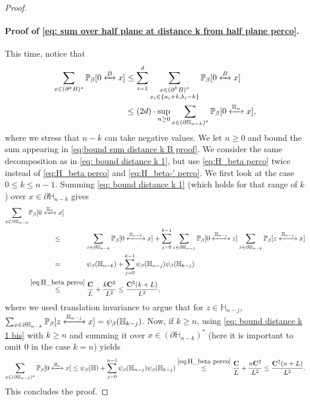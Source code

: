 \documentclass[11pt,a4paper]{article}
\numberwithin{equation}{section}
\theoremstyle{plain}
\theoremstyle{definition}
\newcommand\bfC{\mathbf{C}}
\newcommand{\connect}{\xleftrightarrow}
\begin{document}
\begin{proof}
 \paragraph{Proof of  \eqref{eq: sum over half plane at distance k from half plane perco}.} This time, notice that
 \begin{align}\notag
 	\sum_{x\in (\partial^k B)^*}\mathbb P_\beta[0\connect{B\:}x]&\leq \sum_{i=1}^{d}\sum_{\substack{x\in (\partial^k B)^*\\x_i\in\{a_i+k,b_i-k\}}}\mathbb P_{\beta}[0\connect{B\:}x]\\&\leq (2d)\cdot \sup_{n\geq 0}\sum_{x\in (\partial \mathbb H_{n-k})^*}\mathbb P_\beta[0\connect{\mathbb H_n\:}x],\label{eq:bound sum distance k B proof}
 \end{align}
where we stress that $n-k$ can take negative values.
 We let $n\geq 0$ and bound the sum appearing in \eqref{eq:bound sum distance k B proof}. We consider the same decomposition as in \eqref{eq: bound distance k 1}, but use \eqref{eq:H_beta perco} twice instead of \eqref{eq:H_beta perco} and \eqref{eq:H_beta-' perco}. We first look at the case $0\leq k \leq n-1$. Summing \eqref{eq: bound distance k 1} (which holds for that range of $k$) over $x\in \partial \mathbb H_{n-k}$ gives 
  \begin{align}\notag
  	 \sum_{x\in \partial\mathbb H_{n-k}}&\mathbb P_\beta [0\connect{\mathbb H_n\:}x]\\&\stackrel{\phantom{\eqref{eq:H_beta perco}}}\leq \sum_{x\in \partial\mathbb H_{n-k}}\mathbb P_\beta[0\connect{\mathbb H_{n-k}\:}x]+\sum_{j=0}^{k-1}\sum_{z\in \partial \mathbb H_{n-j}}\mathbb P_\beta[0\connect{\mathbb H_{n-j}\:}z]\sum_{x\in \partial\mathbb H_{n-k}}\mathbb P_\beta[z\connect{\mathbb H_{n-j}\:}x]\notag
  	 \\&\stackrel{\phantom{\eqref{eq:H_beta perco}}}=\psi_\beta(\mathbb H_{n-k})+\sum_{j=0}^{k-1}\psi_\beta(\mathbb H_{n-j})\psi_\beta(\mathbb H_{k-j})\notag
  	 \\&\stackrel{\eqref{eq:H_beta perco}}\leq \frac{\bfC}{L}+\frac{k\bfC^2}{L^2}\leq \frac{\bfC^2(k+L)}{L^2},
 \end{align}
 where we used translation invariance to argue that for $z\in \mathbb H_{n-j}$, $\sum_{x\in \partial\mathbb H_{n-k}}\mathbb P_\beta[z\connect{\mathbb H_{n-j}\:}x]=\psi_\beta(\mathbb H_{k-j})$.
Now, if $k\geq n$, using \eqref{eq: bound distance k 1 bis} with $k\geq n$ and summing it over $x\in (\partial \mathbb H_{n-k})^*$ (here it is important to omit 0 in the case $k=n$) yields
 \begin{equation}
 	\sum_{x\in (\partial \mathbb H_{n-k})^*}\mathbb P_\beta[0\connect{\mathbb H_n\:}x]\leq \psi_\beta(\mathbb H)+\sum_{j=0}^{n-1}\psi_\beta(\mathbb H_{n-j})\psi_\beta(\mathbb H_{k-j})\stackrel{\eqref{eq:H_beta perco}}\leq  \frac{\bfC}{L}+\frac{n\bfC^2}{L^2}\leq \frac{\bfC^2(n+L)}{L^2}.
 \end{equation}
This concludes the proof.
\end{proof}
\end{document}
